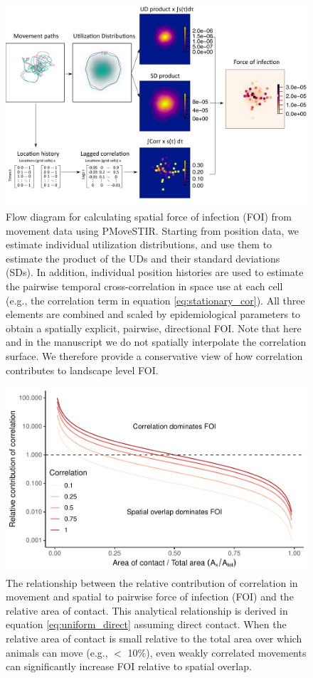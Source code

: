 \documentclass[letterpaper]{article}
\begin{document}
 \begin{figure}
     \includegraphics[width=\textwidth]{figures/steps_diagram.png}
     \caption{Flow diagram for calculating spatial force of infection (FOI) from movement data using PMoveSTIR. Starting from position data, we estimate individual utilization distributions, and use them to estimate the product of the UDs and their standard deviations (SDs). In addition, individual position histories are used to estimate the pairwise temporal cross-correlation in space use at each cell (e.g., the correlation term in equation \ref{eq:stationary_cor}). All three elements are combined and scaled by epidemiological parameters to obtain a spatially explicit, pairwise, directional FOI. Note that here and in the manuscript we do not spatially interpolate the correlation surface. We therefore provide a conservative view of how correlation contributes to landscape level FOI.}
 	\label{fig:steps}
 \end{figure}

\begin{figure}
    \includegraphics[width=\textwidth]{figures/correlation_analytical_figure.pdf}
    \caption{The relationship between the relative contribution of correlation in movement and spatial to pairwise force of infection (FOI) and the relative area of contact. This analytical relationship is derived in equation \ref{eq:uniform_direct} assuming direct contact.  When the relative area of contact is small relative to the total area over which animals can move (e.g., $<$ 10\%), even weakly correlated movements can significantly increase FOI relative to spatial overlap.}
    \label{fig:analytical_corr}
\end{figure}
\end{document}

